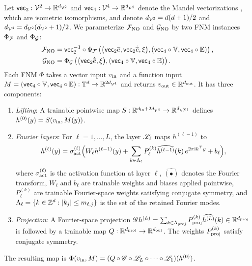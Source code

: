 \documentclass[3p, 12pt, preprint]{elsarticle}
\begin{document}
\begin{example}
Let $\mathsf{vec}_2:{\mathcal{V}}^2\to\mathbb{R}^{d_{{\mathcal{V}}^2}}$ and $\mathsf{vec}_4:{\mathcal{V}}^4\to\mathbb{R}^{d_{{\mathcal{V}}^4}}$ denote the Mandel vectorizations \cite{helnwein2001some}, which are isometric isomorphisms, and denote $d_{{\mathcal{V}}^2}={d(d+1)}/{2}$ and $d_{{\mathcal{V}}^4}={d_{{\mathcal{V}}^2}(d_{{\mathcal{V}}^2}+1)}/{2}$. We parameterize ${\mathcal{F}}_{\rm NO}$ and ${\mathcal{G}}_{\rm NO}$ by two FNM instances $\Phi_{{\mathcal{F}}}$ and $\Phi_{{\mathcal{G}}}$:
\begin{subequations}\label{eq:F_and_G}
    \begin{align}
    {\mathcal{F}}_{\rm NO} &= \mathsf{vec}_2^{-1}\circ\Phi_{{\mathcal{F}}}\left(\bigl(\mathsf{vec}_2\overline{e},\mathsf{vec}_2\dot{\overline{e}},\xi\bigr), \left(\mathsf{vec}_4\circ \mathbb{V},\mathsf{vec}_4\circ\mathbb{E}\right)\right),\label{eq:stress_response}\\
    {\mathcal{G}}_{\rm NO} &= \Phi_{{\mathcal{G}}}\left(\bigl(\mathsf{vec}_2\dot{\overline{e}},\xi\bigr), \left(\mathsf{vec}_4\circ \mathbb{V},\mathsf{vec}_4\circ\mathbb{E}\right)\right).\label{eq:kinetic_response}
\end{align}
\end{subequations}
Each FNM $\Phi$ takes a vector input $v_{\rm in}$ and a function input $M=(\mathsf{vec}_4\circ \mathbb{V},\mathsf{vec}_4\circ\mathbb{E}):\mathbb{T}^d\to\mathbb{R}^{2d_{{\mathcal{V}}^4}}$ and returns $v_{\rm out}\in\mathbb{R}^{d_{\mathrm{out}}}$. It has three components:

\begin{enumerate}[label=(\roman*)]
    \item \textit{Lifting}: A trainable pointwise map $S:\mathbb{R}^{d_{\mathrm{in}}+2d_{{\mathcal{V}}^4}}\to\mathbb{R}^{d_{h^{(0)}}}$ defines $h^{(0)}(y)=S(v_{\rm in},M(y))$.
    \item \textit{Fourier layers}: For $\ell=1,\dots,L$, the layer ${\mathscr{L}}_\ell$ maps $h^{(\ell-1)}$ to
    \begin{equation*}
    h^{(\ell)}(y)=\sigma_{\rm act}^{(\ell)}\Bigl(W_{\ell}h^{(\ell-1)}(y)+\sum_{k\in\Lambda_{\ell}} P_{\ell}^{(k)}\widehat{h^{(\ell-1)}}(k)\,e^{2\pi\mathrm{i} k^{\top}y}+b_{\ell}\Bigr),
    \end{equation*}
    where $\sigma_{\rm act}^{(\ell)}$ is the activation function at layer $\ell$, $\widehat{(\bullet)}$ denotes the Fourier transform, $W_{\ell}$ and $b_{\ell}$ are trainable weights and biases applied pointwise, $P_{\ell}^{(k)}$ are trainable Fourier-space weights satisfying conjugate symmetry, and $\Lambda_{\ell}=\{k\in\mathbb{Z}^d : |k_j|\le m_{\ell,j}\}$ is the set of the retained Fourier modes.
    \item \textit{Projection}: A Fourier-space projection ${\mathscr{G}} h^{(L)}=\sum_{k\in\Lambda_{\rm proj}} P_{\rm proj}^{(k)}\widehat{h^{(L)}}(k)\in\mathbb{R}^{d_{\mathrm{proj}}}$ is followed by a trainable map $Q:\mathbb{R}^{d_{\mathrm{proj}}}\to\mathbb{R}^{d_{\mathrm{out}}}$. The weights $P_{\rm proj}^{(k)}$ satisfy conjugate symmetry.
\end{enumerate}
The resulting map is $\Phi(v_{\rm in},M)=(Q\circ{\mathscr{G}}\circ{\mathscr{L}}_L\circ\cdots\circ{\mathscr{L}}_1)(h^{(0)})$. 
\end{example}
\end{document}

